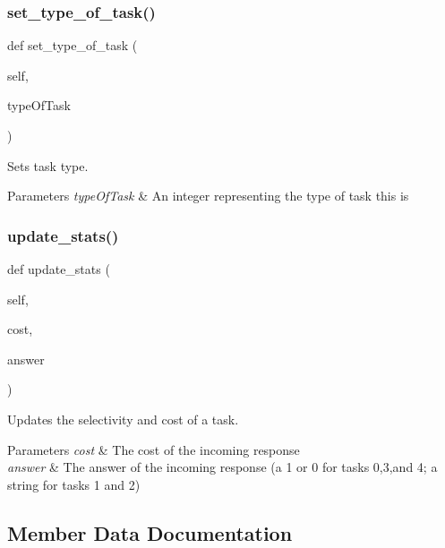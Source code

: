 \subsubsection{\texorpdfstring{set\_type\_of\_task()}{set\_type\_of\_task()}}
{\footnotesize\ttfamily def set\+\_\+type\+\_\+of\+\_\+task (\begin{DoxyParamCaption}\item[{}]{self,  }\item[{}]{type\+Of\+Task }\end{DoxyParamCaption})}



Sets task type. 


\begin{DoxyParams}{Parameters}
{\em type\+Of\+Task} & An integer representing the type of task this is \\
\hline
\end{DoxyParams}
\mbox{\label{classjoinapp_1_1models_1_1task__management__models_1_1_task_stats_a874fc59d510f25a4bea891ea44e76774}} 
\subsubsection{\texorpdfstring{update\_stats()}{update\_stats()}}
{\footnotesize\ttfamily def update\+\_\+stats (\begin{DoxyParamCaption}\item[{}]{self,  }\item[{}]{cost,  }\item[{}]{answer }\end{DoxyParamCaption})}



Updates the selectivity and cost of a task. 


\begin{DoxyParams}{Parameters}
{\em cost} & The cost of the incoming response \\
\hline
{\em answer} & The answer of the incoming response (a 1 or 0 for tasks 0,3,and 4; a string for tasks 1 and 2) \\
\hline
\end{DoxyParams}


\subsection{Member Data Documentation}
\mbox{\label{classjoinapp_1_1models_1_1task__management__models_1_1_task_stats_a829ec2b8120035f51c97cc32f217e148}} 
